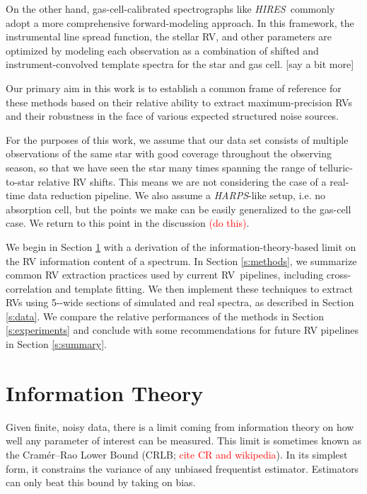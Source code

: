 \documentclass[modern]{aastex61}
\newcommand{\ang}{\text{\normalfont\AA}}
\newcommand{\todo}[1]{\textcolor{red}{#1}}  %
\newcommand{\acronym}[1]{{\small{#1}}}
\newcommand{\project}[1]{\textsl{#1}}
\newcommand{\HARPS}{\project{\acronym{HARPS}}}
\newcommand{\HIRES}{\project{\acronym{HIRES}}}
\newcommand{\RV}{\acronym{RV}}
\newcommand{\CRLB}{\acronym{CRLB}}
\begin{document}
On the other hand, gas-cell-calibrated spectrographs like \HIRES\ commonly adopt a more comprehensive forward-modeling approach. 
In this framework, the instrumental line spread function, the stellar RV, and other parameters are optimized by modeling each observation as a combination of shifted and instrument-convolved template spectra for the star and gas cell. [say a bit more]

Our primary aim in this work is to establish a common frame of reference for these methods based on their relative ability to extract maximum-precision RVs and their robustness in the face of various expected structured noise sources.

For the purposes of this work, we assume that our data set consists of multiple observations of the same star with good coverage throughout the observing season, so that we have seen the star many times spanning the range of telluric-to-star relative RV shifts. 
This means we are not considering the case of a real-time data reduction pipeline. 
We also assume a \HARPS-like setup, i.e. no absorption cell, but the points we make can be easily generalized to the gas-cell case. 
We return to this point in the discussion \todo{(do this)}.

We begin in Section \ref{s:info} with a derivation of the information-theory-based limit on the RV information content of a spectrum. 
In Section \ref{s:methods}, we summarize common RV extraction practices used by current \RV\ pipelines, including cross-correlation and template fitting. 
We then implement these techniques to extract \RV s using 5-\ang-wide sections of simulated and real spectra, as described in Section \ref{s:data}. 
We compare the relative performances of the methods in Section \ref{s:experiments} and conclude with some recommendations for future RV pipelines in Section \ref{s:summary}. 



\section{Information Theory}
\label{s:info}

Given finite, noisy data, there is a limit coming from information
theory on how well any parameter of interest can be measured.
This limit is
sometimes known as the Cram\'er--Rao Lower Bound (\CRLB; \todo{cite CR and wikipedia}).
In its simplest form, it constrains the variance of any unbiased
frequentist estimator.
Estimators can only beat this bound by taking on bias.
\end{document}
